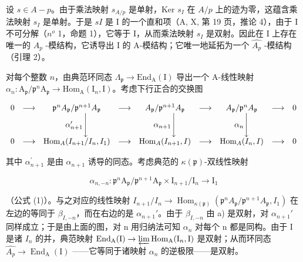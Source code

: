 设 \(s \in A - p\)。由于乘法映射 \(s_{A/p}\) 是单射，Ker \(s_I\) 在 \(A/p\) 上的迹为零，这蕴含乘法映射 \(s_I\) 是单射。于是 \(sI\) 是 I 的一个直和项（A, X, 第 19 页，推论 4），由于 I 不可分解（\(n^o\) 1，命题 1），它等于 I，从而乘法映射 \(s_I\) 是双射。因此在 I 上存在唯一的 \(A_p\) -模结构，它诱导出 I 的 A-模结构；它唯一地延拓为一个 \(\widehat{A_p}\) -模结构（引理 2）。

对每个整数 \(n\)，由典范环同态 \(\Lambda_{\mathfrak{p}} \longrightarrow \mathrm{End}_{\mathrm{A}}(\mathrm{I})\) 导出一个 A-线性映射 \(\alpha_{n}: \mathrm{A}_{\mathfrak{p}}/\mathfrak{p}^{n}\mathrm{A}_{\mathfrak{p}} \longrightarrow \mathrm{Hom}_{\mathrm{A}}(\mathrm{I}_{n},\mathrm{I})\)。考虑下行正合的交换图

\[
\begin{array}{c c c c c c c c c} 0 & \longrightarrow & \mathfrak {p} ^ {n} A _ {\mathfrak {p}} / \mathfrak {p} ^ {n + 1} A _ {\mathfrak {p}} & \longrightarrow & A _ {\mathfrak {p}} / \mathfrak {p} ^ {n + 1} A _ {\mathfrak {p}} & \longrightarrow & A _ {\mathfrak {p}} / \mathfrak {p} ^ {n} A _ {\mathfrak {p}} & \longrightarrow & 0 \\ & & \alpha_ {n + 1} ^ {\prime} \Bigg \downarrow & & \alpha_ {n + 1} \Bigg \downarrow & & \alpha_ {n} \Bigg \downarrow \\ 0 & \longrightarrow & \operatorname{Hom} _ {A} (I _ {n + 1} / I _ {n}, I _ {1}) & \longrightarrow & \operatorname{Hom} _ {A} (I _ {n + 1}, I) & \longrightarrow & \operatorname{Hom} _ {A} (I _ {n}, I) & \longrightarrow & 0 \end{array}
\]

其中 \(\alpha_{n+1}^{\prime}\) 是由 \(\alpha_{n+1}\) 诱导的同态。考虑典范的 \(\kappa(\mathfrak{p})\)-双线性映射

\[
\alpha_ {n, - n}: \mathfrak {p} ^ {n} \mathrm{A} _ {\mathfrak {p}} / \mathfrak {p} ^ {n + 1} \mathrm{A} _ {\mathfrak {p}} \times \mathrm{I} _ {n + 1} / \mathrm{I} _ {n} \longrightarrow \mathrm{I} _ {1}
\]

（公式 (1)）。与之对应的线性映射 \(I_{n+1}/I_{n} \longrightarrow \operatorname{Hom}_{\kappa(\mathfrak{p})}(\mathfrak{p}^{n}A_{\mathfrak{p}}/\mathfrak{p}^{n+1}A_{\mathfrak{p}}, I_{1})\) 在左边的等同于 \(\beta_{I,-n}\)，而在右边的是 \(\alpha_{n+1}'\)。由于 \(\beta_{I,-n}\) 由 a) 是双射，对 \(\alpha_{n+1}'\) 同样成立；于是由上面的图，对 n 用归纳法可知 \(\alpha_{n}\) 对每个 n 都是同构。由于 I 是诸 \(I_{n}\) 的并，典范映射 \(\operatorname{End}_{\mathrm{A}}(\mathrm{I}) \to \varprojlim \operatorname{Hom}_{\mathrm{A}}(\mathrm{I}_{n}, \mathrm{I})\) 是双射；从而环同态 \(\widehat{A_{p}} \to \operatorname{End}_{\mathrm{A}}(\mathrm{I})\) ——它等同于诸映射 \(\alpha_{n}\) 的逆极限——是双射。

